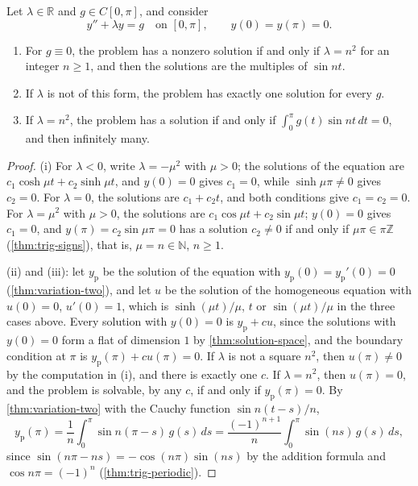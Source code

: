 \begin{proposition}
\label{prop:boundary-value}
Let $\lambda\in\mathbb R$ and $g\in C[0,\pi]$, and consider
\[
y''+\lambda y=g\quad\text{on }[0,\pi],\qquad y(0)=y(\pi)=0 .
\]
\begin{enumerate}
\item For $g\equiv0$, the problem has a nonzero solution if and only if $\lambda=n^2$ for an integer $n\ge1$, and then the solutions are the multiples of $\sin nt$.
\item If $\lambda$ is not of this form, the problem has exactly one solution for every $g$.
\item If $\lambda=n^2$, the problem has a solution if and only if $\int_0^\pi g(t)\sin nt\,dt=0$, and then infinitely many.
\end{enumerate}
\end{proposition}

\begin{proof}
(i) For $\lambda<0$, write $\lambda=-\mu^2$ with $\mu>0$; the solutions of the equation are $c_1\cosh\mu t+c_2\sinh\mu t$, and $y(0)=0$ gives $c_1=0$, while $\sinh\mu\pi\ne0$ gives $c_2=0$. For $\lambda=0$, the solutions are $c_1+c_2t$, and both conditions give $c_1=c_2=0$. For $\lambda=\mu^2$ with $\mu>0$, the solutions are $c_1\cos\mu t+c_2\sin\mu t$; $y(0)=0$ gives $c_1=0$, and $y(\pi)=c_2\sin\mu\pi=0$ has a solution $c_2\ne0$ if and only if $\mu\pi\in\pi\mathbb Z$ (\cref{thm:trig-signs}), that is, $\mu=n\in\mathbb N$, $n\ge1$.

(ii) and (iii): let $y_{\mathrm p}$ be the solution of the equation with $y_{\mathrm p}(0)=y_{\mathrm p}'(0)=0$ (\cref{thm:variation-two}), and let $u$ be the solution of the homogeneous equation with $u(0)=0$, $u'(0)=1$, which is $\sinh(\mu t)/\mu$, $t$ or $\sin(\mu t)/\mu$ in the three cases above. Every solution with $y(0)=0$ is $y_{\mathrm p}+cu$, since the solutions with $y(0)=0$ form a flat of dimension $1$ by \cref{thm:solution-space}, and the boundary condition at $\pi$ is $y_{\mathrm p}(\pi)+cu(\pi)=0$. If $\lambda$ is not a square $n^2$, then $u(\pi)\ne0$ by the computation in (i), and there is exactly one $c$. If $\lambda=n^2$, then $u(\pi)=0$, and the problem is solvable, by any $c$, if and only if $y_{\mathrm p}(\pi)=0$. By \cref{thm:variation-two} with the Cauchy function $\sin n(t-s)/n$,
\[
y_{\mathrm p}(\pi)=\frac1n\int_0^\pi\sin n(\pi-s)\,g(s)\,ds=\frac{(-1)^{n+1}}n\int_0^\pi\sin(ns)\,g(s)\,ds ,
\]
since $\sin(n\pi-ns)=-\cos(n\pi)\sin(ns)$ by the addition formula and $\cos n\pi=(-1)^n$ (\cref{thm:trig-periodic}).
\end{proof}

